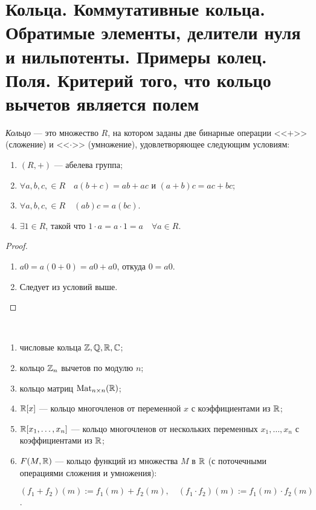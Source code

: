 \section{Кольца. Коммутативные кольца. Обратимые элементы, делители нуля и нильпотенты. Примеры колец. Поля. Критерий того, что кольцо вычетов является полем}

\begin{definition}
    \textit{Кольцо} --- это множество $R$, на котором заданы две бинарные операции <<$+$>> (сложение) и <<$\cdot$>> (умножение), удовлетворяющее следующим условиям:
    
    \begin{enumerate}
        \item $(R, +)$ --- абелева группа;
        \item $\forall a, b, c, \in R \quad a(b + c) = ab + ac$ и $(a + b)c = ac + bc$;
        \item $\forall a, b, c, \in R \quad (ab)c = a(bc)$.
        \item $\exists 1 \in R$, такой что $1 \cdot a = a \cdot 1 = a \quad \forall a \in R$.
    \end{enumerate}
\end{definition}

\begin{comment}~
    \begin{enumerate}
        \item $0 \cdot a = a \cdot 0 = 0 \quad \forall a \in R$;
        \item Если $|R| > 1$, то $1 \neq 0$.
    \end{enumerate}
\end{comment}

\begin{proof}~
    \begin{enumerate}
        \item $a0 = a(0 + 0) = a0 + a0$, откуда $0 = a0$.
        \item Следует из условий выше.
    \end{enumerate}
\end{proof}

\begin{example}~
    \begin{enumerate}
    \item числовые кольца $\mathbb{Z}, \mathbb{Q}, \mathbb{R}, \mathbb{C}$;
    \item кольцо $\mathbb{Z}_n$ вычетов по модулю $n$;
    \item кольцо матриц $\text{Mat}_{n \times n}(\mathbb{R})$;
    \item $\mathbb{R}[x]$ --- кольцо многочленов от переменной $x$ с коэффициентами из $\mathbb{R}$;
    \item $\mathbb{R}[x_1, \dots, x_n]$ --- кольцо многочленов от нескольких переменных $x_1, \dots, x_n$ с коэффициентами из $\mathbb{R}$;
    \item $F(M, \mathbb{R})$ --- кольцо функций из множества $M$ в $\mathbb{R}$ (с поточечными операциями сложения и умножения):

        $(f_1 + f_2)(m) := f_1(m) + f_2(m), \quad (f_1 \cdot f_2)(m) := f_1(m) \cdot f_2(m)$.
    \end{enumerate}
\end{example}

